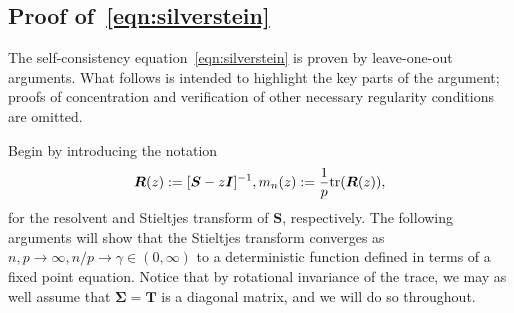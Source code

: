 \documentclass{article}
\newcommand{\bSigma}{\boldsymbol{\Sigma}}
\newcommand{\bS}{\boldsymbol{S}}
\newcommand{\bT}{\boldsymbol{T}}
\newcommand{\bR}{\boldsymbol{R}}
\newcommand{\bI}{\boldsymbol{I}}
\begin{document}
\subsection{Proof of~\eqref{eqn:silverstein}}
\label{subsec:proof-of-eqn:silverstein}

The self-consistency equation~\eqref{eqn:silverstein} is proven by leave-one-out arguments. What follows is intended to highlight the key parts of the argument; proofs of concentration and verification of other necessary regularity conditions are omitted. 

Begin by introducing the notation
$$
\bR(z) := [\bS - z \bI]^{-1}, m_n(z) := \frac{1}{p} \tr(\bR(z)),
$$
for the resolvent and Stieltjes transform of $\bS$, respectively. The following arguments will show that the Stieltjes transform converges as $n, p \to \infty, n/p \to \gamma \in (0,\infty)$ to a deterministic function defined in terms of a fixed point equation. Notice that by rotational invariance of the trace, we may as well assume that $\bSigma = \bT$ is a diagonal matrix, and we will do so throughout. 
\end{document}
